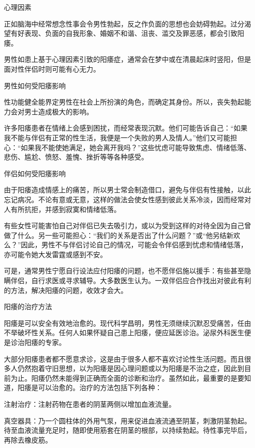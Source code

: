 \documentclass[12pt,UTF8]{ctexbook}
\begin{document}
心理因素

正如脑海中经常想念性事会令男性勃起，反之作负面的思想也会妨碍勃起。过分渴望有好表现、负面的自我形象、婚姻不和谐、沮丧、滥交及罪恶感，都会引致阳痿。

男性如患上基于心理因素引致的阳痿症，通常会在梦中或在清晨起床时竖阳，但是面对性伴侣时则可能有心无力。





男性如何受阳痿影响


性功能健全能界定男性在社会上所扮演的角色，而确定其身份。所以，丧失勃起能力会对男士造成极大的影响。

许多阳痿患者在情绪上会感到困扰，而经常表现沉默。他们可能告诉自己：“如果我不能与伴侣有正常的性生活，我便是一个失败的男人及情人。”他们又可能担心：“如果我不能使她满足，她会离开我吗？”这些忧虑可能导致焦虑、情绪低落、悲伤、尴尬、愤怒、羞愧、挫折等等各种感受。





伴侣如何受阳痿影响


由于阳痿造成情感上的痛苦，所以男士常会制造借口，避免与伴侣有性接触，以此忘记病况。不论有意或无意，这样的做法会使女性感到彼此关系冷淡，因而经常对人有所抗拒，并感到寂寞和情绪低落。

有些女性可能害怕自己对伴侣已失去吸引力，或以为受到这样的对待全因为自己曾做了什么。另一些可能担心：“我们的关系是否出了什么问题？”或“他另结新欢么？”因此，男性不与伴侣讨论自己的情况，可能会令伴侣感到忧虑和情绪低落，亦可能令她大发雷霆或感到不安。

可是，通常男性宁愿自行设法应付阳痿的问题，也不愿伴侣施以援手：有些甚至隐瞒伴侣，自行求医或寻求辅导。大多数医生认为。一双伴侣应合作找出对彼此有利的方法，解决阳痿的问题，收效才会大。





阳痿的治疗方法


阳痿是可以安全有效地治愈的。现代科学昌明，男性无须继续沉默忍受痛苦，任由不举破坏性关系。任何人如果怀疑自己患上阳痿，便应延医诊治。泌尿外科医生便是诊治阳痿的专家。

大部分阳痿患者都不愿意求诊，这是由于很多人都不喜欢讨论性生活问题。而且很多人仍然抱着守旧思想，以为阳痿是因心理问题或以为阳痿是不治之症，因此到目前为止。阳痿仍然未能得到正确而全面的诊断和治疗。虽然如此，最重要的是要知道，阳痿是可以治愈的。治疗的方法包括下列各种：

注射治疗：注射药物在患者的阴茎两侧以增加血液流量。

真空器具：乃一个圆柱体的外用气泵，用来促进血液流通至阴茎，刺激阴茎勃起。待至血液流量充足时，随即使用筋套在阴茎的根部，以持续勃起。待性事完毕后，再除去橡皮筋。
\end{document}
